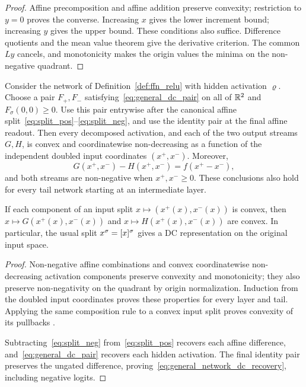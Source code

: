 \begin{proof}
Affine precomposition and affine addition preserve convexity; restriction to $y=0$ proves the converse. Increasing $x$ gives the lower increment bound; increasing $y$ gives the upper bound. These conditions also suffice. Difference quotients and the mean value theorem give the derivative criterion. The common $Ly$ cancels, and monotonicity makes the origin values the minima on the non-negative quadrant.
\end{proof}

\begin{theoremenv}\label{thm:general_dc_network}
Consider the network of Definition~\ref{def:ffn_relu} with hidden activation $\varrho$. Choose a pair $F_+,F_-$ satisfying~\eqref{eq:general_dc_pair} on all of $\mathbb{R}^2$ and $F_\sigma(0,0)\ge0$. Use this pair entrywise after the canonical affine split~\eqref{eq:split_pos}--\eqref{eq:split_neg}, and use the identity pair at the final affine readout. Then every decomposed activation, and each of the two output streams $G,H$, is convex and coordinatewise non-decreasing as a function of the independent doubled input coordinates $(x^+,x^-)$. Moreover,
\begin{equation}
    G(x^+,x^-)-H(x^+,x^-)=f(x^+-x^-),
    \label{eq:general_network_dc_recovery}
\end{equation}
and both streams are non-negative when $x^+,x^-\ge0$. These conclusions also hold for every tail network starting at an intermediate layer.

If each component of an input split $x\mapsto(x^+(x),x^-(x))$ is convex, then $x\mapsto G(x^+(x),x^-(x))$ and $x\mapsto H(x^+(x),x^-(x))$ are convex. In particular, the usual split $x^\sigma=[x]^{\sigma}$ gives a DC representation on the original input space.
\end{theoremenv}

\begin{proof}
Non-negative affine combinations and convex coordinatewise non-decreasing activation components preserve convexity and monotonicity; they also preserve non-negativity on the quadrant by origin normalization. Induction from the doubled input coordinates proves these properties for every layer and tail. Applying the same composition rule to a convex input split proves convexity of its pullbacks \parencite{Amos2017}.

Subtracting~\eqref{eq:split_neg} from~\eqref{eq:split_pos} recovers each affine difference, and~\eqref{eq:general_dc_pair} recovers each hidden activation. The final identity pair preserves the ungated difference, proving~\eqref{eq:general_network_dc_recovery}, including negative logits.
\end{proof}

